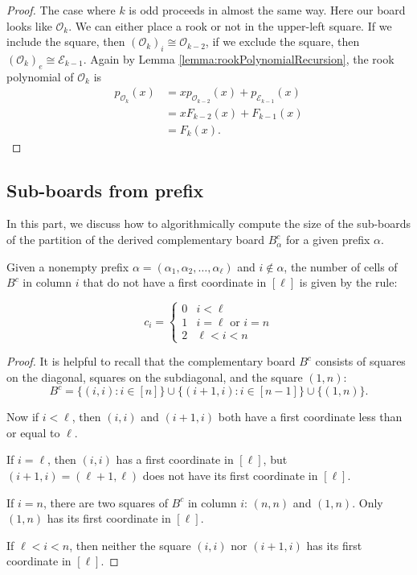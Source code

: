 \begin{proof}
  The case where $k$ is odd proceeds in almost the same way.
  Here our board looks like $\mathcal{O}_{k}$.
  We can either place a rook or not in the upper-left square.
  If we include the square, then $(\mathcal{O}_{k})_i \cong \mathcal{O}_{k-2}$,
  if we exclude the square, then $(\mathcal{O}_{k})_e \cong \mathcal{E}_{k-1}$.
  Again by Lemma \ref{lemma:rookPolynomialRecursion}, the rook polynomial
  of $\mathcal{O}_{k}$ is
  \begin{align}
    p_{\mathcal{O}_{k}}(x)
    &= xp_{\mathcal{O}_{k-2}}(x) + p_{\mathcal{E}_{k-1}}(x) \\
    &= xF_{k-2}(x) + F_{k-1}(x) \\
    &= F_{k}(x).
  \end{align}
\end{proof}

\subsection{Sub-boards from prefix}

In this part, we discuss how to algorithmically compute the size of the
sub-boards of the partition of the derived complementary board $B_\alpha^c$
for a given prefix $\alpha$.

\begin{lemma}
  Given a nonempty prefix $\alpha = (\alpha_1, \alpha_2, \dots, \alpha_\ell)$
  and $i \not\in \alpha$,
  the number of cells of $B^c$ in column $i$ that do not have
  a first coordinate in $[\ell]$
  is given by the rule:
  \begin{singlespace}
  \begin{equation}
    c_i = \begin{cases}
      0 & i < \ell \\
      1 & i = \ell \text{ or } i = n \\
      2 & \ell < i < n
    \end{cases}
  \end{equation}
  \end{singlespace}
\end{lemma}

\begin{proof}
  It is helpful to recall that the complementary board $B^c$ consists of squares
  on the diagonal, squares on the subdiagonal, and the square $(1, n)$:
  \[
    B^c = \{(i, i) : i \in [n]\} \cup \{(i + 1, i) : i \in [n-1]\} \cup \{(1,n)\}.
  \]

  Now if $i < \ell$, then $(i,i)$ and $(i + 1, i)$ both have a first coordinate
  less than or equal to $\ell$.

  If $i = \ell$, then $(i, i)$ has a first coordinate in $[\ell]$, but
  $(i + 1, i) = (\ell + 1, \ell)$ does not have its first coordinate in $[\ell]$.

  If $i = n$, there are two squares of $B^c$ in column $i$: $(n, n)$ and $(1, n)$.
  Only $(1,n)$ has its first coordinate in $[\ell]$.

  If $\ell < i < n$, then neither the square $(i, i)$ nor $(i+1, i)$ has
  its first coordinate in $[\ell]$.
\end{proof}

